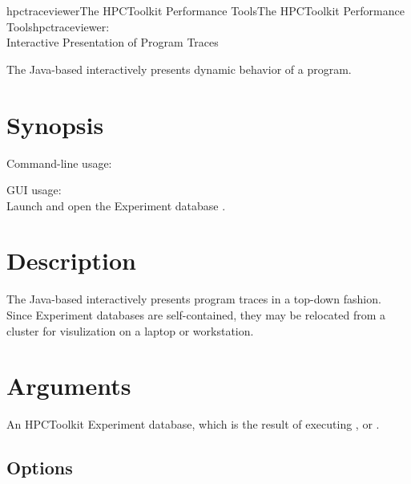 \documentclass[english]{article}
\begin{document}
\begin{Name}{1}{hpctraceviewer}{The HPCToolkit Performance Tools}{The HPCToolkit Performance Tools}{hpctraceviewer:\\ Interactive Presentation of Program Traces}

The Java-based  interactively presents dynamic behavior of a program. 

\end{Name}

\section{Synopsis}

Command-line usage:\\
\SP\SP\SP{}  

GUI usage:\\
\SP\SP\SP Launch  and open the Experiment database .


\section{Description}

The Java-based  interactively presents program traces in a top-down fashion.
Since Experiment databases are self-contained, they may be relocated from a cluster for visulization on a laptop or workstation.

\section{Arguments}

\begin{Description}
\item[\Arg{hpctoolkit-database}] An HPCToolkit Experiment database, which is the result of executing ,  or .
\end{Description}


\subsection{Options}
\end{document}
